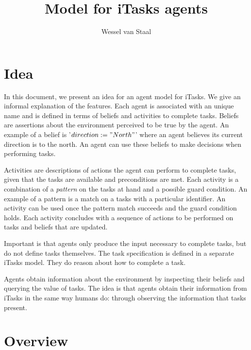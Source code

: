 \documentclass[english]{article}
\title{Model for iTasks agents}
\author{Wessel van Staal}
\begin{document}
\maketitle

\section{Idea}

In this document, we present an idea for an agent model for iTasks. We give an informal explanation of the features. Each agent is associated with an unique name and is defined in terms of beliefs and activities to complete tasks. Beliefs are assertions about the environment perceived to be true by the agent. An example of a belief is '$direction := "North"$' where an agent believes its current direction is to the north. An agent can use these beliefs to make decisions when performing tasks. 

Activities are descriptions of actions the agent can perform to complete tasks, given that the tasks are available and preconditions are met. Each activity is a combination of a \textit{pattern} on the tasks at hand and a possible guard condition. An example of a pattern is a match on a tasks with a particular identifier. An activity can be used once the pattern match succeeds and the guard condition holds. Each activity concludes with a sequence of actions to be performed on tasks and beliefs that are updated. 

Important is that agents only produce the input necessary to complete tasks, but do not define tasks themselves. The task specification is defined in a separate iTasks model. They do reason about how to complete a task.

Agents obtain information about the environment by inspecting their beliefs and querying the value of tasks. The idea is that agents obtain their information from iTasks in the same way humans do: through observing the information that tasks present. 

\section{Overview}
\end{document}
